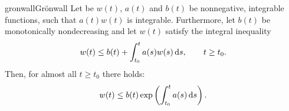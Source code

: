 \begin{Lemma*}{gronwall}{Grönwall}
  Let be $w(t)$, $a(t)$ and $b(t)$ be nonnegative, integrable
  functions, such that $a(t)w(t)$ is integrable. Furthermore, let
  $b(t)$ be monotonically nondecreasing and let $w(t)$ satisfy the
  integral inequality
  \begin{gather}
    \label{eq:awa:10}
    w(t) \le b(t) + \int_{t_0}^t a(s)w(s)\,\mathrm{d} s,\qquad t\ge t_0.
  \end{gather}
  Then, for almost all $t \ge t_0$ there holds:
  \begin{gather}
    \label{eq:awa:11}
    w(t) \le b(t) \exp\left( \int_{t_0}^t  a(s) \,\mathrm{d} s\right).
  \end{gather}
\end{Lemma*}

